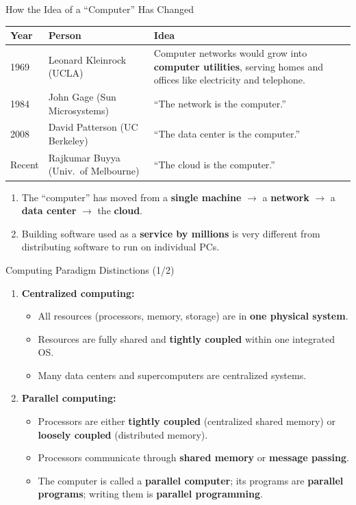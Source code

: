 \begin{frame}{How the Idea of a ``Computer'' Has Changed}
\begin{table}
\centering
\renewcommand{\arraystretch}{1.4}
\scriptsize
\begin{tabular}{|p{1.2cm}|p{4.3cm}|p{7cm}|}
\hline
\textbf{Year} & \textbf{Person} & \textbf{Idea} \\ \hline
1969 & Leonard Kleinrock (UCLA) & Computer networks would grow into \textbf{computer utilities}, serving homes and offices like electricity and telephone. \\ \hline
1984 & John Gage (Sun Microsystems) & ``The network is the computer.'' \\ \hline
2008 & David Patterson (UC Berkeley) & ``The data center is the computer.'' \\ \hline
Recent & Rajkumar Buyya (Univ.\ of Melbourne) & ``The cloud is the computer.'' \\ \hline
\end{tabular}
\end{table}
\begin{enumerate}
\item<1-> The ``computer'' has moved from a \textbf{single machine} $\rightarrow$ a \textbf{network} $\rightarrow$ a \textbf{data center} $\rightarrow$ the \textbf{cloud}.
\item<2-> Building software used as a \textbf{service by millions} is very different from distributing software to run on individual PCs.
\end{enumerate}
\end{frame}

\begin{frame}{Computing Paradigm Distinctions (1/2)}
\begin{enumerate}
\item<1-> \textbf{Centralized computing:}
    \begin{itemize}
    \item All resources (processors, memory, storage) are in \textbf{one physical system}.
    \item Resources are fully shared and \textbf{tightly coupled} within one integrated OS.
    \item Many data centers and supercomputers are centralized systems.
    \end{itemize}
\item<2-> \textbf{Parallel computing:}
    \begin{itemize}
    \item Processors are either \textbf{tightly coupled} (centralized shared memory) or \textbf{loosely coupled} (distributed memory).
    \item Processors communicate through \textbf{shared memory} or \textbf{message passing}.
    \item The computer is called a \textbf{parallel computer}; its programs are \textbf{parallel programs}; writing them is \textbf{parallel programming}.
    \end{itemize}
\end{enumerate}
\end{frame}

